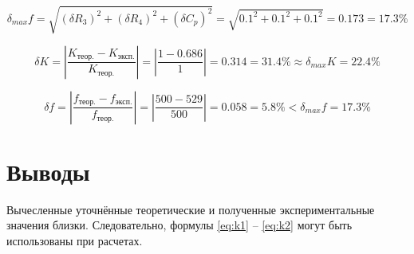 \begin{displaymath}
	\delta_{max} f = \sqrt{(\delta R_3)^2 + (\delta R_4)^2 + (\delta C_p)^2} =  \sqrt{0.1^2 + 0.1^2 + 0.1^2} = 0.173 = 17.3 \%
\end{displaymath}

\begin{displaymath}
	\delta K = \left|\frac{K_\text{теор.} - K_\text{эксп.}}{K_\text{теор.}} \right| = \left|\frac{1 - 0.686}{1}\right| = 0.314 = 31.4\% \approx \delta_{max} K = 22.4\%
\end{displaymath}

\begin{displaymath}
	\delta f = \left|\frac{f_\text{теор.} - f_\text{эксп.}}{f_\text{теор.}} \right| = \left|\frac{500 - 529}{500}\right| = 0.058 = 5.8\% < \delta_{max} f = 17.3\%
\end{displaymath}

\section{Выводы}

Вычесленные уточнённые теоретические и полученные экспериментальные значения близки. Следовательно, формулы \ref{eq:k1} -- \ref{eq:k2} могут быть использованы при расчетах.

